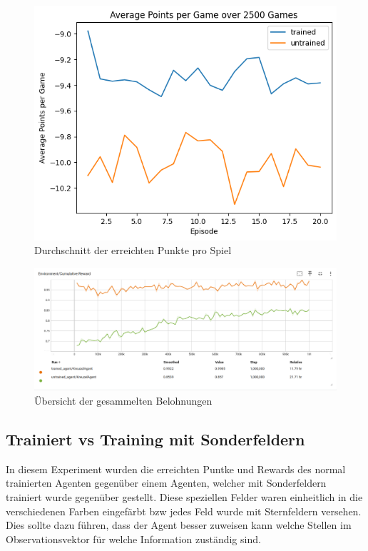 \begin{figure}[!t]
    \centering
    \includegraphics[scale=0.6]{Bilder/Points_trained_vs_untrained.png}
    \caption{Durchschnitt der erreichten Punkte pro Spiel }
\end{figure}
\begin{figure}[!th]
    \centering
    \includegraphics[scale=0.3]{Bilder/vergleich_untrained_vs_trained.png}
    \caption{Übersicht der gesammelten Belohnungen}
\end{figure}


\subsection{Trainiert vs Training mit Sonderfeldern}
In diesem Experiment wurden die erreichten Puntke und Rewards des normal trainierten Agenten gegenüber einem Agenten, welcher mit Sonderfeldern trainiert wurde gegenüber gestellt.
Diese speziellen Felder waren einheitlich in die verschiedenen Farben eingefärbt bzw jedes Feld wurde mit Sternfeldern versehen. Dies sollte dazu führen, dass der Agent besser zuweisen kann welche Stellen im Observationsvektor für welche Information zuständig sind.

